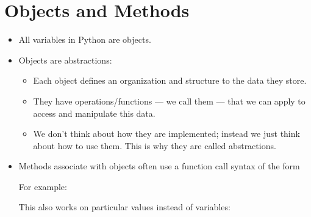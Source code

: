 \documentclass[letterpaper,10pt,english]{sphinxmanual}
\begin{document}
\section{Objects and Methods}
\label{\detokenize{lecture_notes/lec04_modules_functions1:objects-and-methods}}\begin{itemize}
\item {} 
All variables in Python are objects.

\item {} 
Objects are abstractions:
\begin{itemize}
\item {} 
Each object defines an organization and structure to the data they
store.

\item {} 
They have operations/functions — we call them  —
that we can apply to access and manipulate this data.

\item {} 
We don’t think about how they are implemented; instead we just
think about how to use them.  This is why they are called
abstractions.

\end{itemize}

\item {} 
Methods associate with objects often use a function call syntax of
the form

%
\begin{sphinxVerbatim}[commandchars=\\\{\}]
\end{sphinxVerbatim}

For example:

%
\begin{sphinxVerbatim}[commandchars=\\\{\}]
  
 
\end{sphinxVerbatim}

This also works on particular values instead of variables:

%
\begin{sphinxVerbatim}[commandchars=\\\{\}]
\end{sphinxVerbatim}


\end{itemize}
\end{document}
